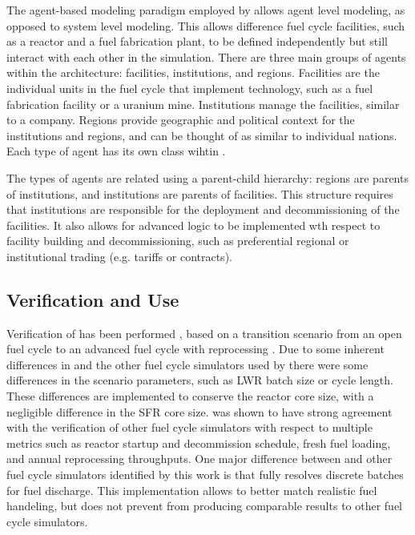 The agent-based modeling paradigm employed by \Cyclus allows agent level 
modeling, as opposed to system level modeling. This allows difference 
fuel cycle facilities, such as a reactor and a fuel fabrication plant, to 
be defined independently but still interact with each other in the 
simulation. There are three main groups of agents within the \Cyclus 
architecture: facilities, institutions, and regions. Facilities are 
the individual units in the fuel cycle that implement technology, 
such as a fuel fabrication facility or a uranium mine. Institutions 
manage the facilities, similar to a company. Regions provide geographic 
and political context for the institutions and regions, and can be thought 
of as similar to individual nations. Each type of agent has its own 
class wihtin \Cyclus. 

The types of agents are related using a parent-child hierarchy: regions are
parents of institutions, and institutions are parents of facilities. This 
structure requires that institutions are responsible for the deployment 
and decommissioning of the facilities. It also allows for advanced logic 
to be implemented wth respect to facility building and decommissioning, 
such as preferential regional or institutional trading (e.g. tariffs or 
contracts). 

\subsection{Verification and Use}
Verification of \Cyclus has been performed \cite{bae_standardized_2019}, 
based on a transition scenario from an open fuel cycle to an advanced
fuel cycle with reprocessing \cite{feng_standardized_2016}. Due to 
some inherent differences in \Cyclus and the other fuel cycle simulators 
used by \cite{feng_standardized_2016} there were some differences in 
the scenario parameters, such as \gls{LWR} batch size or 
cycle length. These differences are implemented to conserve the reactor 
core size, with a negligible difference in the \gls{SFR} core size. \Cyclus 
was shown to have strong agreement with the verification of other 
fuel cycle simulators \cite{bae_standardized_2019} with respect to 
multiple metrics such as reactor startup and decommission schedule, fresh 
fuel loading, and annual reprocessing throughputs. One major difference
between \Cyclus and other fuel cycle simulators identified by this work 
is that \Cyclus fully resolves discrete batches for fuel discharge. This 
implementation allows \Cyclus to better match realistic fuel handeling, but 
does not prevent \Cyclus from producing comparable results to other 
fuel cycle simulators. 

